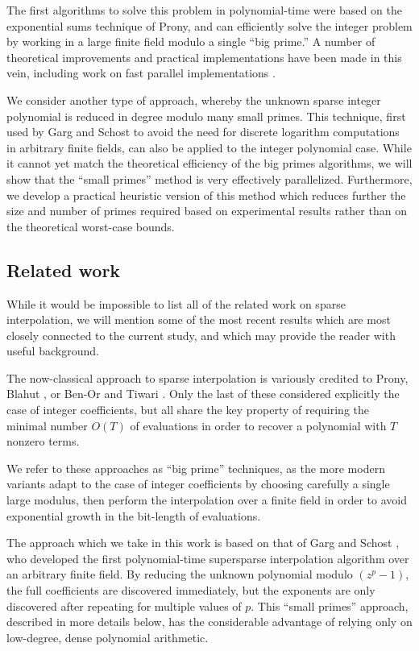 \documentclass[letterpaper,10pt]{article}
\def\cite{\citep}
\begin{document}
The first algorithms to solve this problem in polynomial-time were based
on the exponential sums technique of Prony, and can efficiently solve
the integer problem by working in a large finite field modulo a single
``big prime.'' A number of theoretical improvements and practical
implementations have been made in this vein, including work on fast
parallel implementations \cite{JM10,HL15}.

We consider another type of approach, whereby the unknown sparse
integer polynomial is reduced in degree modulo many small primes. This
technique, first used by Garg and Schost to avoid the need for discrete
logarithm computations in arbitrary finite fields, can also be applied
to the integer polynomial case. While it cannot yet match the
theoretical efficiency of the big primes algorithms, we will show that the
``small primes'' method is very effectively parallelized. Furthermore, we
develop a practical heuristic version of this method which reduces
further the
size and number of primes required based on experimental results rather
than on the theoretical worst-case bounds.

\subsection{Related work}

While it would be impossible to list all of the related work on sparse
interpolation, we will mention some of the most recent results which are
most closely connected to the current study, and which may provide the
reader with useful background.

The now-classical approach to sparse interpolation is variously credited
to Prony, Blahut \cite{Bla79}, or Ben-Or and Tiwari \cite{BT88}. Only
the last of these considered explicitly the case of integer
coefficients, but all share the key property of requiring the minimal
number $O(T)$ of evaluations in order to recover a polynomial with 
$T$ nonzero terms.

We refer to these approaches as ``big prime'' techniques, as the more
modern variants \cite{KY89,Kal10a} adapt to the case of integer
coefficients by choosing carefully a single large modulus, then perform
the interpolation over a finite field in order to avoid exponential
growth in the bit-length of evaluations.

The approach which we take in this work is based on that of Garg and
Schost \cite{GS09}, who developed the first polynomial-time supersparse
interpolation algorithm over an arbitrary finite field. By reducing the
unknown polynomial modulo $(z^p-1)$, the full coefficients
are discovered immediately, but the exponents are only discovered after
repeating for multiple values of $p$. This ``small primes'' approach,
described in more details below, has the considerable advantage of
relying only on low-degree, dense polynomial arithmetic.
\end{document}
